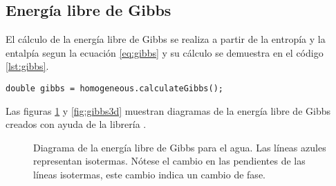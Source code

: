 \subsection{Energía libre de Gibbs}
	
	El cálculo de la energía libre de Gibbs se realiza a partir de la entropía y la entalpía segun la ecuación \ref{eq:gibbs} y su cálculo se demuestra en el código \ref{lst:gibbs}.

	\begin{lstlisting}[label={lst:gibbs},caption={Cálculo de la energía libre de Gibbs con la librería \Materia}]
		double gibbs = homogeneous.calculateGibbs();
	\end{lstlisting}

	Las figuras \ref{fig:2dgibbs} y \ref{fig:gibbs3d} muestran diagramas de la energía libre de Gibbs creados con ayuda de la librería \Materia.

\begin{figure}[!h]
	\centering	
	\caption{Diagrama de la energía libre de Gibbs para el agua. Las líneas azules representan isotermas. Nótese el cambio en las pendientes de las líneas isotermas, este cambio indica un cambio de fase.}\label{fig:2dgibbs}
\end{figure}

